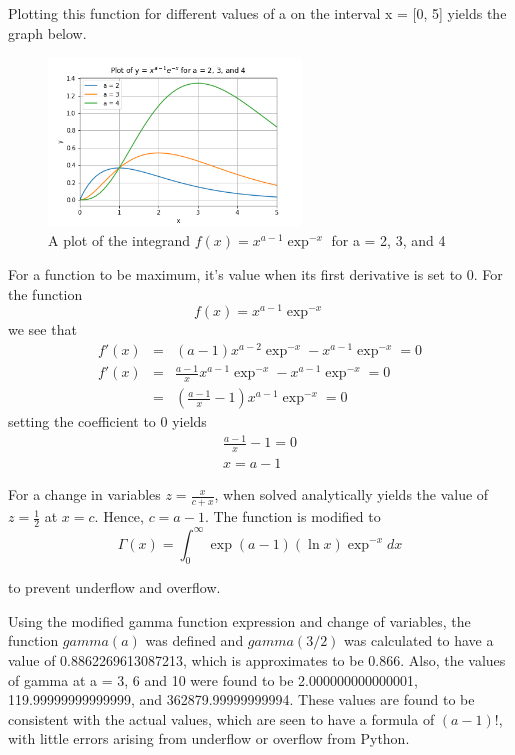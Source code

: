 \documentclass[11pt]{article}
\begin{document}
Plotting this function for different values of a on the interval x = [0, 5] yields the graph below.
\\
\begin{figure}[h]\begin{center} 
		\vspace{12pt}
		\includegraphics[width=0.6\textwidth]{gamma_integrand.png}
		\caption{A plot of the integrand $f(x) = x^{a-1}\exp^{-x} $ for a = 2, 3, and 4 }
		\label{fig:integrand} 
	\end{center}
\end{figure} 


For a function to be maximum, it's value when its first derivative is set to $0$. For the function 
\begin{equation}
	f(x) = x^{a-1}\exp^{-x} 
\end{equation}
we see that 
\begin{eqnarray}
	f'(x) &=& (a-1)x^{a-2}\exp^{-x} - x^{a-1}\exp^{-x} = 0 \\
	f'(x) &=& \frac{a-1}{x}x^{a-1}\exp^{-x} - x^{a-1}\exp^{-x} = 0\\
	      &=&  (\frac{a-1}{x} -1)x^{a-1}\exp^{-x} = 0
\end{eqnarray}
setting the coefficient to $0$ yields
\begin{eqnarray}
	\frac{a-1}{x} - 1 = 0 \\
	x = a - 1
\end{eqnarray}

For a change in variables $z = \frac{x}{c + x}$, when solved analytically yields the value of  $z = \frac{1}{2}$ at $x = c$. Hence, $c = a -1$. The function is modified to 
\begin{equation}
	\Gamma(x) = \int_{0}^{\infty}\exp{(a-1)(\ln{x})}\exp^{-x} dx
\end{equation}

to prevent underflow and overflow.

Using the modified gamma function expression and change of variables, the function $gamma(a)$ was defined and $gamma(3/2)$ was calculated to have a value of 0.8862269613087213, which is approximates to be 0.866. Also, the values of gamma at a = 3, 6 and 10 were found to be 2.000000000000001, 119.99999999999999, and 362879.99999999994. These values are found to be consistent with the actual values, which are seen to have a formula of $(a-1)!$, with little errors arising from underflow or overflow from Python.
\end{document}
